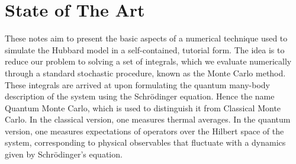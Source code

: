 \section{State of The Art}
\label{sec:int_state}

These notes aim to present the basic aspects of a numerical technique used to simulate the Hubbard model in a self-contained, tutorial form. The idea is to reduce our problem to solving a set of integrals, which we evaluate numerically through a standard stochastic procedure, known as the Monte Carlo method. These integrals are arrived at upon formulating the quantum many-body description of the system using the Schr\"odinger equation. Hence the name Quantum Monte Carlo, which is used to distinguish it from Classical Monte Carlo. In the classical version, one measures thermal averages. In the quantum version, one measures expectations of operators over the Hilbert space of the system, corresponding to physical observables that fluctuate with a dynamics given by Schr\"odinger's equation.
